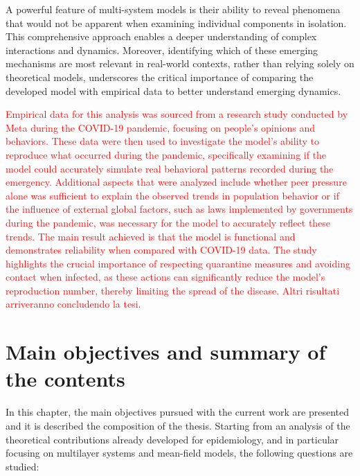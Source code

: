 A powerful feature of multi-system models is their ability to reveal phenomena that would not be apparent when examining individual components in isolation. This comprehensive approach enables a deeper understanding of complex interactions and dynamics. Moreover, identifying which of these emerging mechanisms are most relevant in real-world contexts, rather than relying solely on theoretical models, underscores the critical importance of comparing the developed model with empirical data to better understand emerging dynamics.

\textcolor{red}{Empirical data for this analysis was sourced from a research study conducted by Meta during the COVID-19 pandemic, focusing on people's opinions and behaviors.
These data were then used to investigate the model's ability to reproduce what occurred during the pandemic, specifically examining if the model could accurately simulate real behavioral patterns recorded during the emergency.
Additional aspects that were analyzed include whether peer pressure alone was sufficient to explain the observed trends in population behavior or if the influence of external global factors, such as laws implemented by governments during the pandemic, was necessary for the model to accurately reflect these trends.}
\textcolor{red}{The main result achieved is that the model is functional and demonstrates reliability when compared with COVID-19 data. The study highlights the crucial importance of respecting quarantine measures and avoiding contact when infected, as these actions can significantly reduce the model's reproduction number, thereby limiting the spread of the disease. Altri risultati arriveranno concludendo la tesi.}

\chapter{Main objectives and summary of the contents}

In this chapter, the main objectives pursued with the current work are presented and it is described the composition of the thesis. 
Starting from an analysis of the theoretical contributions already developed for epidemiology, and in particular focusing on multilayer systems and mean-field models, the following questions are studied:

